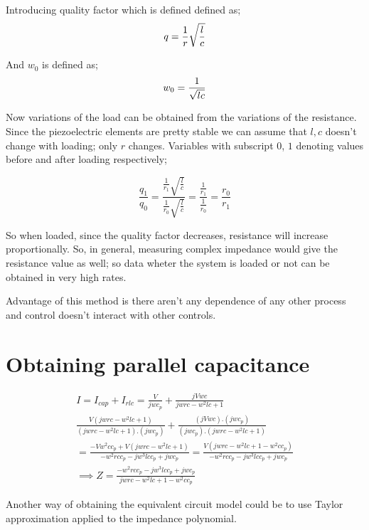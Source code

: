 \documentclass{article}
\begin{document}
Introducing quality factor which is defined defined as;
\begin{equation}{\label{def:qualityfactor}}
    q = \frac{1}{r} \sqrt{\frac{l}{c}}
\end{equation}

And $w_0$ is defined as;
\begin{equation}{\label{def:omegazero}}
    w_0 = \frac{1}{\sqrt{lc}}
\end{equation}

Now variations of the load can be obtained from the variations
of the resistance. Since the piezoelectric elements are pretty stable
we can assume that $l, c$ doesn't change with loading; only $r$
changes. Variables with subscript $0$, $1$ denoting values before and after
loading respectively;

\begin{equation}
    \frac{q_1}{q_0} =
    \frac{\frac{1}{r_1} \sqrt{\frac{l}{c}}}{\frac{1}{r_0} \sqrt{\frac{l}{c}}}
    = \frac{\frac{1}{r_1}}{\frac{1}{r_0}}
    = \frac{r_0}{r_1}
\end{equation}

So when loaded, since the quality factor decreases, resistance will increase
proportionally. So, in general, measuring complex impedance would give the resistance
value as well; so data wheter the system is loaded or not can be obtained in very high
rates.

Advantage of this method is there aren't any dependence of any other process and
control doesn't interact with other controls.

\section{Obtaining parallel capacitance}

\begin{multline}
    I = I_{cap} + I_{rlc} = \frac{V}{jwc_p} + \frac{jVwc}{jwrc - w^2lc +1} \\
    \frac{V(jwrc - w^2lc +1)}{(jwrc - w^2lc +1) . (jwc_p)} + \frac{(jVwc) . (jwc_p)}{(jwc_p).(jwrc - w^2lc +1)} \\
    = \frac{-Vw^2cc_p + V(jwrc - w^2lc +1)}{-w^2rcc_p - jw^3lcc_p +jwc_p}
    = \frac{V(jwrc - w^2lc + 1 - w^2cc_p)}{-w^2rcc_p - jw^3lcc_p +jwc_p} \\
    \implies Z = \frac{-w^2rcc_p - jw^3lcc_p +jwc_p}{jwrc - w^2lc + 1 - w^2cc_p}
\end{multline}

Another way of obtaining the equivalent circuit model could be to use Taylor approximation applied to the
impedance polynomial.
\end{document}
